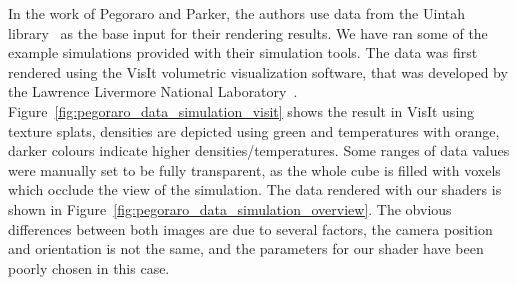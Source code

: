 In the work of Pegoraro and Parker, the authors use data from the Uintah library~\cite{Uintah} as the base input for their rendering results.
We have ran some of the example simulations provided with their simulation tools.
The data was first rendered using the VisIt volumetric visualization software, that was developed by the Lawrence Livermore National Laboratory~\cite{VisIt}.
Figure~\ref{fig:pegoraro_data_simulation_visit} shows the result in VisIt using texture splats, densities are depicted using green and temperatures with orange, darker colours indicate higher densities/temperatures.
Some ranges of data values were manually set to be fully transparent, as the whole cube is filled with voxels which occlude the view of the simulation. 
The data rendered with our shaders is shown in Figure~\ref{fig:pegoraro_data_simulation_overview}.
The obvious differences between both images are due to several factors, the camera position and orientation is not the same, and the parameters for our shader have been poorly chosen in this case.

